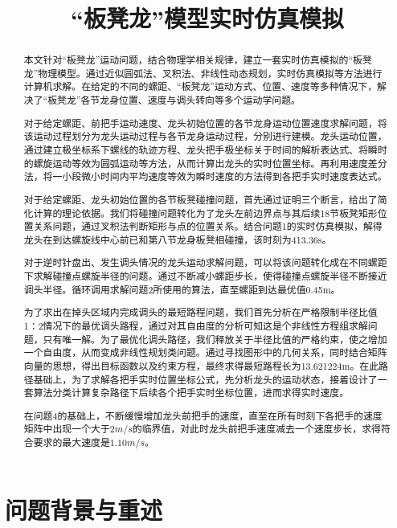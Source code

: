 \documentclass{cumcmthesis1}
\title{“板凳龙”模型实时仿真模拟}
\begin{document}
 \maketitle
 \begin{abstract}
 本文针对“板凳龙”运动问题，结合物理学相关规律，建立一套实时仿真模拟的“板凳龙”物理模型。通过近似圆弧法、叉积法、非线性动态规划，实时仿真模拟等方法进行计算机求解。在给定的不同的螺距、“板凳龙”运动方式、位置、速度等多种情况下，解决了“板凳龙”各节龙身位置、速度与调头转向等多个运动学问题。
 \par
 对于给定螺距、前把手运动速度、龙头初始位置的各节龙身运动位置速度求解问题，将该运动过程划分为龙头运动过程与各节龙身运动过程，分别进行建模。龙头运动位置，通过建立极坐标系下螺线的轨迹方程、龙头把手极坐标关于时间的解析表达式、将瞬时的螺旋运动等效为圆弧运动等方法，从而计算出龙头的实时位置坐标。再利用速度差分法，将一小段微小时间内平均速度等效为瞬时速度的方法得到各把手实时速度表达式。
 \par
 对于给定螺距、龙头初始位置的各节板凳碰撞问题，首先通过证明三个断言，给出了简化计算的理论依据。我们将碰撞问题转化为了龙头左前边界点与其后续18节板凳矩形位置关系问题，通过叉积法判断矩形与点的位置关系。结合问题1的实时仿真模拟，解得龙头在到达螺旋线中心前已和第八节龙身板凳相碰撞，该时刻为413.36s。
 \par
 对于逆时针盘出、发生调头情况的龙头运动求解问题，可以将该问题转化成在不同螺距下求解碰撞点螺旋半径的问题。通过不断减小螺距步长，使得碰撞点螺旋半径不断接近调头半径。循环调用求解问题2所使用的算法，直至螺距到达最优值0.45m。
 \par
为了求出在掉头区域内完成调头的最短路程问题，我们首先分析在严格限制半径比值1：2情况下的最优调头路程，通过对其自由度的分析可知这是个非线性方程组求解问题，只有唯一解。为了最优化调头路径，我们释放关于半径比值的严格约束，使之增加一个自由度，从而变成非线性规划类问题。通过寻找图形中的几何关系，同时结合矩阵向量的思想，得出目标函数以及约束方程，最终求得最短路程长为13.621224m。在此路径基础上，为了求解各把手实时位置坐标公式，先分析龙头的运动状态，接着设计了一套算法分类计算复杂路径下后续各个把手实时坐标位置，进而求得实时速度。
 \par
在问题4的基础上，不断缓慢增加龙头前把手的速度，直至在所有时刻下各把手的速度矩阵中出现一个大于$2m/s$的临界值，对此时龙头前把手速度减去一个速度步长，求得符合要求的最大速度是$1.10m/s$。
 

\end{abstract}
\section{问题背景与重述}
\end{document}
